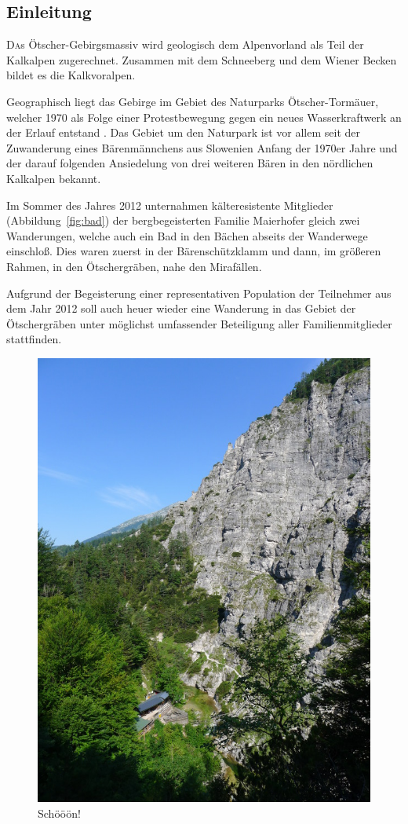 \documentclass[twoside]{article}
\begin{document}
\begin{multicols}{2} %

\section{Einleitung}

\lettrine[nindent=0em,lines=3]{D} as Ötscher-Gebirgsmassiv wird geologisch dem Alpenvorland als Teil der
Kalkalpen zugerechnet. Zusammen mit dem Schneeberg und dem Wiener Becken bildet es die Kalkvoralpen. \cite{SH:2012}

Geographisch liegt das Gebirge im Gebiet des Naturparks Ötscher-Tormäuer, welcher 1970 als Folge einer Protestbewegung gegen ein neues Wasserkraftwerk an der Erlauf
entstand \cite{NOT:2013:Online}. Das Gebiet um den Naturpark ist vor allem seit der Zuwanderung eines Bärenmännchens aus Slowenien Anfang der 1970er Jahre und
der darauf folgenden Ansiedelung von drei weiteren Bären in den nördlichen Kalkalpen bekannt.

Im Sommer des Jahres 2012 unternahmen kälteresistente Mitglieder (Abbildung~\ref{fig:bad}) der
bergbegeisterten Familie Maierhofer gleich zwei Wanderungen, welche auch ein Bad in den
Bächen abseits der Wanderwege einschloß. Dies waren zuerst in der Bärenschützklamm und dann, im größeren Rahmen, in den Ötschergräben, nahe den Mirafällen.

Aufgrund der Begeisterung einer representativen Population der Teilnehmer aus dem Jahr 2012 soll auch heuer wieder eine Wanderung in das Gebiet der
Ötschergräben unter möglichst umfassender Beteiligung aller Familienmitglieder stattfinden.
\begin{figure}[H]
\begin{center}
  \includegraphics[trim = 0 15 0 0, clip, natwidth=600, natheight=800, width=.45\textwidth]{Figures/oetschergraeben.jpg}
\end{center}
\caption{Schööön!}
\label{fig:oetschergraeben}
\end{figure}


\end{multicols}
\end{document}
